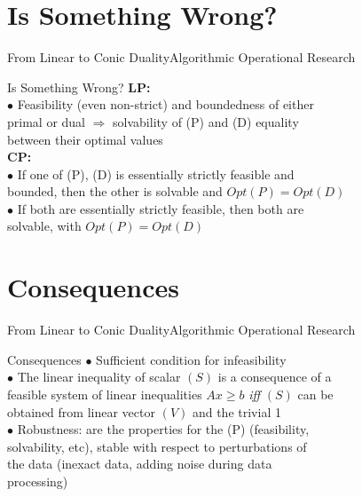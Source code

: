 \documentclass[11pt,aspectratio=169]{beamer}
\newcommand{\TT}{From Linear to Conic Duality}
\newcommand{\TL}{Algorithmic Operational Research}
\newcommand{\PIV}{Is Something Wrong?}
\newcommand{\PV}{Consequences}
\begin{document}
\section{\PIV}
\begin{frame}{\TT}{\TL}
 \begin{block}{\PIV}
\Large
\textbf{LP:}\\
$\bullet$ Feasibility (even non-strict) and boundedness of either\\
\hspace{4mm}primal or dual $\Rightarrow$ solvability of (P) and (D) equality\\
\hspace{4mm}between their optimal values\\
\textbf{CP:}\\
$\bullet$ If one of (P), (D) is essentially strictly feasible and\\
\hspace{4mm}bounded, then the other is solvable and $Opt(P) = Opt(D)$\\
$\bullet$ If both are essentially strictly feasible, then both are\\ 
\hspace{4mm}solvable, with $Opt(P) = Opt(D)$

 \end{block}
\end{frame}


\section{\PV}
\begin{frame}{\TT}{\TL}
 \begin{block}{\PV}\pause
\Large
$\bullet$ Sufficient condition for infeasibility \\
$\bullet$ The linear inequality of scalar $(S)$ is a consequence of a \\ 
\hspace{4mm} feasible system of linear inequalities $Ax \geq b$ \textit{iff} $(S)$ can be \\ 
\hspace{4mm} obtained from linear vector $(V)$ and the trivial 1  \\
$\bullet$  Robustness: are the properties for the (P) (feasibility, 
\\ \hspace{4mm} solvability, etc), stable with respect to perturbations of \\ 
\hspace{4mm} the data  (inexact data, adding noise during data 
\\ 
\hspace{4mm} processing) 
 \end{block}
\end{frame}
\end{document}
